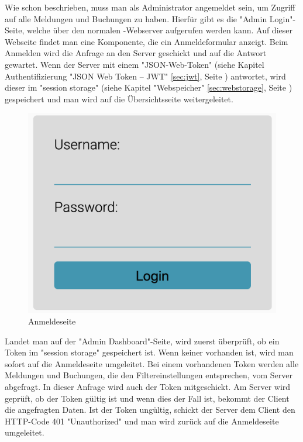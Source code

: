 Wie schon beschrieben, muss man als Administrator angemeldet sein, um Zugriff auf alle Meldungen und Buchungen zu haben. Hierfür gibt es die "Admin Login"-Seite, welche über den normalen \ZELIA-Webserver aufgerufen werden kann. Auf dieser Webseite findet man eine Komponente, die ein Anmeldeformular anzeigt. Beim Anmelden wird die Anfrage an den Server geschickt und auf die Antwort gewartet. Wenn der Server mit einem "JSON-Web-Token" (siehe Kapitel Authentifizierung "JSON Web Token -- JWT" \ref{sec:jwt}, Seite \pageref{sec:jwt}) antwortet, wird dieser im "session storage" (siehe Kapitel "Webspeicher" \ref{sec:webstorage}, Seite \pageref{sec:webstorage}) gespeichert und man wird auf die Übersichtsseite weitergeleitet.

\begin{figure}[H]
    \centering
    \includegraphics[width=120mm]{media/WebComponents/Login_light.png}
    \caption{Anmeldeseite}
\end{figure}

Landet man auf der "Admin Dashboard"-Seite, wird zuerst überprüft, ob ein Token im "session storage" gespeichert ist. Wenn keiner vorhanden ist, wird man sofort auf die Anmeldeseite umgeleitet. Bei einem vorhandenen Token werden alle Meldungen und Buchungen, die den Filtereinstellungen entsprechen, vom Server abgefragt. In dieser Anfrage wird auch der Token mitgeschickt. Am Server wird geprüft, ob der Token gültig ist und wenn dies der Fall ist, bekommt der Client die angefragten Daten. Ist der Token ungültig, schickt der Server dem Client den HTTP-Code 401 "Unauthorized" und man wird zurück auf die Anmeldeseite umgeleitet.

